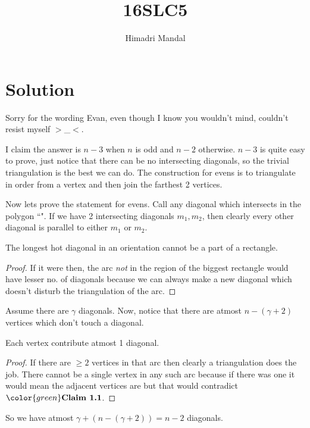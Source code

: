 \documentclass[11pt]{scrartcl}
\title{16SLC5}
\author{Himadri Mandal}
\begin{document}
\maketitle

\section{Solution}

Sorry for the wording Evan, even though I know you wouldn't mind, couldn't resist myself $>$\_$<$.
\begin{soln}
	
I claim the answer is $n-3$ when $n$ is odd and $n-2$ otherwise. 
$n-3$ is quite easy to prove, just notice that there can be no
intersecting diagonals, so the trivial triangulation is the best
we can do. The construction for evens is to triangulate in order from a 
vertex and then join the farthest 2 vertices. 


\bigskip

Now lets prove the statement for evens.
Call any diagonal which intersects in the polygon 
``". If we have 2 intersecting
 diagonals $m_1, m_2$, then clearly every other  diagonal
is parallel to either $m_1$ or $m_2$.

\begin{claim}
	The longest {\color{red}hot} diagonal in an orientation cannot be a part of a  rectangle.
\end{claim}
\begin{proof}
	If it were then, the arc \textit{not} in the region of the biggest  rectangle 
	would have lesser no. of diagonals because we can always make a new  diagonal which
	doesn't disturb the triangulation of the arc. 
\end{proof}
Assume there are $\gamma$  diagonals.
Now, notice that there are atmost $n - (\gamma+2)$  vertices which don't touch a  diagonal.
\begin{claim}
	Each  vertex contribute atmost 1 diagonal.
\end{claim}
\begin{proof}
	If there are $\geq 2$  vertices in that  arc then clearly a triangulation does the job.
	There cannot be a single  vertex in any such arc because
	if there was one it would mean the adjacent vertices are  but that would contradict $\color{green}\textbf{Claim 1.1}$.
\end{proof}

So we have atmost $\gamma + (n - (\gamma+2)) = n-2$ diagonals.
\end{soln}
\end{document}
